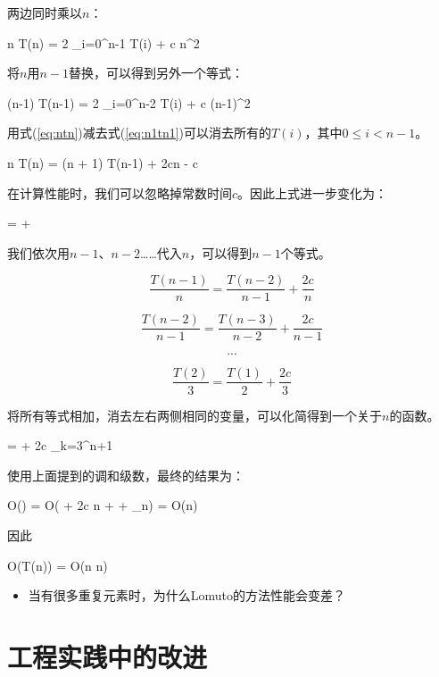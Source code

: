 \documentclass{ctexart}
\begin{document}
两边同时乘以$n$：

\be
n T(n) = 2 \sum_{i=0}^{n-1} T(i) + c n^2
\label{eq:ntn}
\ee

将$n$用$n-1$替换，可以得到另外一个等式：

\be
(n-1) T(n-1) = 2 \sum_{i=0}^{n-2} T(i) + c (n-1)^2
\label{eq:n1tn1}
\ee

用式(\ref{eq:ntn})减去式(\ref{eq:n1tn1})可以消去所有的$T(i)$，其中$0 \leq i < n-1$。

\be
n T(n) = (n + 1) T(n-1) + 2cn - c
\ee

在计算性能时，我们可以忽略掉常数时间$c$。因此上式进一步变化为：

\be
{} =  + 
\ee

我们依次用$n-1$、$n-2$……代入$n$，可以得到$n-1$个等式。

\[
\frac{T(n-1)}{n} = \frac{T(n-2)}{n-1} + \frac{2c}{n}
\]

\[
\frac{T(n-2)}{n-1} = \frac{T(n-3)}{n-2} + \frac{2c}{n-1}
\]

\[
...
\]

\[
\frac{T(2)}{3} = \frac{T(1)}{2} + \frac{2c}{3}
\]

将所有等式相加，消去左右两侧相同的变量，可以化简得到一个关于$n$的函数。

\be
{} =  + 2c \sum_{k=3}^{n+1} 
\ee

使用上面提到的调和级数，最终的结果为：

\be
O() = O( + 2c \ln n + \gamma + \epsilon_n) = O(\lg n)
\ee

因此

\be
O(T(n)) = O(n \lg n)
\ee

\begin{Exercise}
\begin{itemize}
\item 当有很多重复元素时，为什么Lomuto的方法性能会变差？
\end{itemize}
\end{Exercise}


\section{工程实践中的改进}
\end{document}

